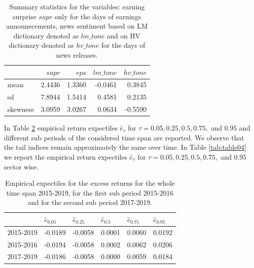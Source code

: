 \documentclass[11pt]{article}
\begin{document}
\begin{table}[h!]

\caption{\label{tab:table02}Summary statistics for the variables: earning surprise $supr$ only for the days of earnings announecements, news sentiment based on LM dictionary denoted as $lm\_tone$ and on HV dictionary denoted as $hv\_tone$ for the days of news releases.}
\centering
\begin{tabular}[t]{l|r|r|r|r}
\hline
  & $supr$ &$eps$ &$lm\_tone$ & $hv\_tone$ \\
\hline
 mean & 2.4436 & 1.3360 & -0.0461 & 0.3845\\
\hline
sd & 7.8944& 1.5414& 0.4581 & 0.2135\\
\hline
 skewness & 3.0959 & 3.0267& 0.0634 & -0.5590\\
\hline
\end{tabular}
\end{table}



In Table \ref{tab:table03} empirical return expectiles \(\hat e_{\tau}\) for \(\tau = 0.05,0.25,0.5,0.75,\) and \(0.95\) and different sub periods of the considered time span are reported. We observe that the tail indices remain approximately the same over time. In Table \ref{tab:table04} we report the empirical return expectiles \(\hat e_{\tau}\) for \(\tau = 0.05,0.25,0.5,0.75,\) and \(0.95\) sector wise.


\begin{table}[h!]

\caption{\label{tab:table03}Empirical expectiles for the excess returns for the whole time span 2015-2019, for the first sub period 2015-2016 and for the second sub period 2017-2019.}
\centering
\begin{tabular}[t]{l|l|l|l|l|l}
\hline
  & $\hat e_{0.05}$ & $\hat e_{0.25}$ & $\hat e_{0.5}$ & $\hat e_{0.75}$ & $\hat e_{0.95}$\\
\hline
2015-2019 & -0.0189 & -0.0058 & 0.0001 & 0.0060 & 0.0192\\
\hline
2015-2016 & -0.0194 & -0.0058 & 0.0002 & 0.0062 & 0.0206\\
\hline
2017-2019 & -0.0186 & -0.0058 & 0.0000 & 0.0059 & 0.0184\\
\hline
\end{tabular}
\end{table}
\end{document}
